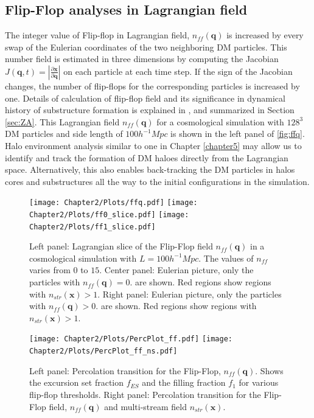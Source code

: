 \subsection{Flip-Flop analyses in Lagrangian field}

The integer value of Flip-flop in Lagrangian field, $n_{ff}(\mathbf{q})$ is increased by every swap of the Eulerian coordinates of the two neighboring DM particles. This number field is estimated in three dimensions by computing the Jacobian  $J(\mathbf{q}, t) = |\frac{\partial\mathbf{x}}{\partial\mathbf{q}}|$  on each particle at each time step. If the sign of the Jacobian changes, the number of flip-flops for the corresponding particles is increased by one. Details of calculation of flip-flop field and its significance in dynamical history of substructure formation is explained in \citep{Shandarin2016}, and summarized in Section \ref{sec:ZA}. This Lagrangian field $n_{ff}(\mathbf{q})$ for a cosmological simulation with $128^3$ DM particles and side length of $100 h^{-1} Mpc$ is shown in the left panel of \autoref{fig:ffq}. Halo environment analysis similar to one in Chapter \ref{chapter5} may allow us to identify and track the formation of DM haloes directly from the Lagrangian space. Alternatively, this also enables back-tracking the DM particles in halos cores and substructures all the way to the initial configurations in the simulation.  

\begin{figure}
\begin{minipage}[t]{.99\linewidth}
 \centering\texttt{[image: Chapter2/Plots/ffq.pdf]} 
\centering\texttt{[image: Chapter2/Plots/ff0\_slice.pdf]} 
 \centering\texttt{[image: Chapter2/Plots/ff1\_slice.pdf]} 
\end{minipage}\hfill
\caption{Left panel: Lagrangian slice of the Flip-Flop field $n_{ff}(\mathbf{q})$ in a cosmological simulation with $L = 100 h^{-1} Mpc$. The values of $n_{ff}$ varies from $0$ to $15$. Center panel: Eulerian picture, only the particles with $n_{ff}(\mathbf{q}) = 0$. are shown. Red regions show regions with $n_{str}(\mathbf{x}) > 1$. Right panel: Eulerian picture, only the particles with $n_{ff}(\mathbf{q}) > 0$. are shown. Red regions show regions with $n_{str}(\mathbf{x}) > 1$.}
\label{fig:ffq}
\end{figure}


\begin{figure}
\begin{minipage}[t]{.99\linewidth}
 \centering\texttt{[image: Chapter2/Plots/PercPlot\_ff.pdf]} 
  \centering\texttt{[image: Chapter2/Plots/PercPlot\_ff\_ns.pdf]}  
\end{minipage}\hfill
\caption{Left panel: Percolation transition for the Flip-Flop, $n_{ff}(\mathbf{q})$. Shows the excursion set fraction $f_{ES}$ and the filling fraction $f_1$ for various flip-flop thresholds. Right panel: Percolation transition for the Flip-Flop field, $n_{ff}(\mathbf{q})$ and multi-stream field $n_{str}(\mathbf{x})$.}
\label{fig:percplot}
\end{figure}



